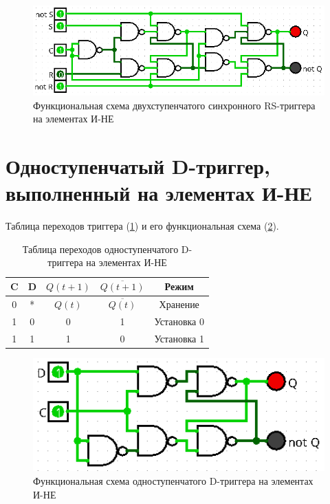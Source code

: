 \documentclass[14pt, a4paper]{extreport}
\begin{document}
\begin{figure}[H]
	\caption{Функциональная схема двухступенчатого синхронного RS-триггера на элементах И-НЕ}
	\label{fig:dual-sync-rs-nand}
	\includegraphics[width=\textwidth]{dual-sync-rs-nand}
\end{figure}

\section{Одноступенчатый D-триггер, выполненный на элементах И-НЕ}
Таблица переходов триггера (\cref{tab:d-nand}) и его функциональная схема (\cref{fig:d-nand}).

\begin{table}[H]
	\caption{Таблица переходов одноступенчатого D-триггера на элементах И-НЕ}
	\label{tab:d-nand}
	\begin{tabular}{|c|c|c|c|c|}
		\hline
		C & D & $Q(t + 1)$ & $\overline{Q(t + 1)}$ & Режим \\
		\hline
		0 & * & $Q(t)$ & $\overline{Q(t)}$ & Хранение \\
		\hline
		1 & 0 & 0 & 1 & Установка 0 \\
		\hline
		1 & 1 & 1 & 0 & Установка 1 \\
		\hline
	\end{tabular}
\end{table}

\begin{figure}[H]
	\caption{Функциональная схема одноступенчатого D-триггера на элементах И-НЕ}
	\label{fig:d-nand}
	\includegraphics[width=\textwidth]{d-nand}
\end{figure}
\end{document}
